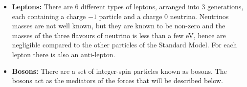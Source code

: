 \begin{itemize}[leftmargin=*]
\item\textbf{Leptons:}
  There are 6 different types of leptons,
  arranged into  3 generations, each containing a charge $-1$ particle and a charge 0 neutrino.
  Neutrinos masses are not well known, but they are known to be non-zero
  and the masses of the three flavours of neutrino is less than a few eV,
  hence are negligible compared to the other particles of the Standard Model.
  For each lepton there is also an anti-lepton. \vspace{0.5em}

 
\item\textbf{Bosons:}
  There are a set of integer-spin particles  known as bosons.
  The bosons act as the mediators of the forces that will be described below.  \vspace{0.5em}
  
\end{itemize}
  
